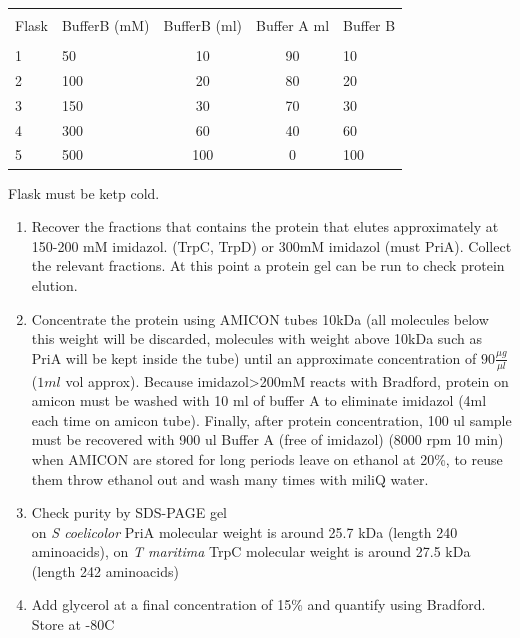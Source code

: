\documentclass[12pt,twoside]{reedthesis}
\begin{document}
  \label{my-label enzyme}
  
  \begin{tabular}{ l l c c l}
  \hline \\ [-1.5ex]
  Flask & BufferB (mM)   & BufferB (ml)  & Buffer A ml & Buffer B  \\  [1ex]
  \hline \\ [-1.5ex]
  1 & 50& 10&  90& 10 \\  [1ex]
  2 & 100& 20& 80& 20 \\  [1ex]
  3 & 150& 30& 70 & 30 \\  [1ex]
  4 & 300& 60& 40 & 60 \\  [1ex]
  5 & 500& 100& 0& 100 \\  [1ex]
  \hline
  \end{tabular}
  
  Flask must be ketp cold.
  
  \begin{enumerate}
  \def\labelenumi{\arabic{enumi}.}
  \setcounter{enumi}{6}
  \item
    Recover the fractions that contains the protein that elutes
    approximately at 150-200 mM imidazol. (TrpC, TrpD) or 300mM imidazol
    (must PriA). Collect the relevant fractions. At this point a protein
    gel can be run to check protein elution.
  \item
    Concentrate the protein using AMICON tubes 10kDa (all molecules below
    this weight will be discarded, molecules with weight above 10kDa such
    as PriA will be kept inside the tube) until an approximate
    concentration of \(90 \frac{\mu g}{\mu l}\) (\(1ml\) vol approx).
    Because imidazol\textgreater{}200mM reacts with Bradford, protein on
    amicon must be washed with 10 ml of buffer A to eliminate imidazol
    (4ml each time on amicon tube). Finally, after protein concentration,
    100 ul sample must be recovered with 900 ul Buffer A (free of
    imidazol) (8000 rpm 10 min) when AMICON are stored for long periods
    leave on ethanol at 20\%, to reuse them throw ethanol out and wash
    many times with miliQ water.
  \item
    Check purity by SDS-PAGE gel\\
    on \emph{S coelicolor} PriA molecular weight is around 25.7 kDa
    (length 240 aminoacids), on \emph{T maritima} TrpC molecular weight is
    around 27.5 kDa (length 242 aminoacids)
  \item
    Add glycerol at a final concentration of 15\% and quantify using
    Bradford. Store at -80C
  \end{enumerate}
  
\end{document}
